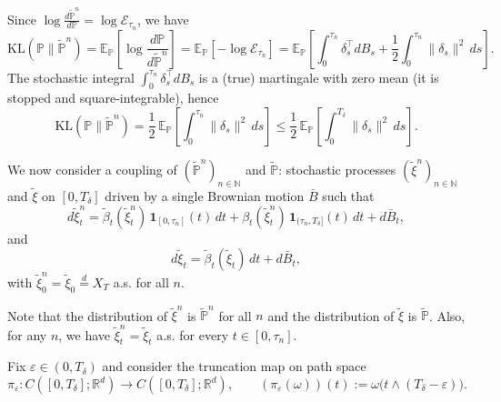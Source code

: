 \documentclass[11pt]{article}
\theoremstyle{definition}
\numberwithin{equation}{section}
\begin{document}
Since $\log\frac{d\tilde{\mathbb P}^n}{d\mathbb P}=\log \mathcal E_{\tau_n}$, we have
\[
\mathrm{KL}(\mathbb P\|\tilde{\mathbb P}^n)
=\mathbb E_{\mathbb P}\!\left[\log\frac{d\mathbb P}{d\tilde{\mathbb P}^n}\right]
=\mathbb E_{\mathbb P}\!\left[-\log \mathcal E_{\tau_n}\right]
=\mathbb E_{\mathbb P}\!\left[\int_0^{\tau_n}\delta_s^\top dB_s+\frac12\int_0^{\tau_n}\|\delta_s\|^2\,ds\right].
\]
The stochastic integral $\int_0^{\tau_n}\delta_s^\top dB_s$ is a (true) martingale with zero mean (it is stopped and square-integrable),
hence
\begin{equation*}%
\mathrm{KL}(\mathbb P\|\tilde{\mathbb P}^n)
=\frac12\,\mathbb E_{\mathbb P}\!\left[\int_0^{\tau_n}\|\delta_s\|^2\,ds\right]
\le \frac12\,\mathbb E_{\mathbb P}\!\left[\int_0^{T_\delta}\|\delta_s\|^2\,ds\right].
\end{equation*}



We now consider a coupling of $(\tilde{\mathbb P}^n)_{n\in\mathbb N}$ and $\tilde{\mathbb P}$: stochastic processes $(\tilde \xi^n)_{n\in\mathbb N}$ and $\tilde \xi$ on $[0,T_\delta]$ driven by a single Brownian motion $\bar B$ such that
\begin{equation*}
d\tilde\xi^n_t=\tilde\beta_t(\tilde\xi^n_t)\,\mathbf 1_{[0,\tau_n]}(t)\,dt+\beta_t(\tilde\xi^n_t)\,\mathbf 1_{(\tau_n,T_\delta]}(t)\,dt+d\bar B_t,
\end{equation*}
and
\begin{equation*}
d\tilde\xi_t = \tilde\beta_t(\tilde\xi_t)\,dt + d\bar B_t,
\end{equation*}
with $\tilde\xi^n_0=\tilde\xi_0\stackrel{d}{=} X_{T}$ a.s. for all $n$.

Note that the distribution of $\tilde \xi^n$ is $\tilde{\mathbb P}^n$ for all $n$ and the distribution of $\tilde \xi$ is $\tilde{\mathbb P}$. Also, for any $n$, we have $\tilde\xi^n_t=\tilde\xi_t$ a.s. for every $t\in[0,\tau_n]$.

Fix $\varepsilon\in(0,T_\delta)$ and consider the truncation map on path space
\[
\pi_\varepsilon:C([0,T_\delta];\mathbb R^d)\to C([0,T_\delta];\mathbb R^d),
\qquad
(\pi_\varepsilon(\omega))(t):=\omega\bigl(t\wedge (T_\delta-\varepsilon)\bigr).
\]
\end{document}
